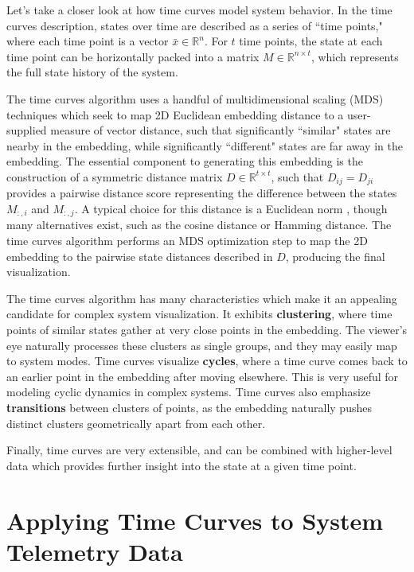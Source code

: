 Let's take a closer look at how time curves model system behavior. In the time curves description, states over time are described as a series of ``time points," where each time point is a vector $\bar{x} \in \mathbb{R}^{n}$. For $t$ time points, the state at each time point can be horizontally packed into a matrix $M \in \mathbb{R}^{n \times t}$, which represents the full state history of the system.

The time curves algorithm uses a handful of multidimensional scaling (MDS) techniques which seek to map 2D Euclidean embedding distance to a user-supplied measure of vector distance, such that significantly ``similar" states are nearby in the embedding, while significantly ``different" states are far away in the embedding. The essential component to generating this embedding is the construction of a symmetric distance matrix $D \in \mathbb{R}^{t \times t}$, such that $D_{ij} = D_{ji}$ provides a pairwise distance score representing the difference between the states $M_{:,i}$ and $M_{:,j}$. A typical choice for this distance is a Euclidean norm \cite{bach2016time}, though many alternatives exist, such as the cosine distance or Hamming distance. The time curves algorithm performs an MDS optimization step to map the 2D embedding to the pairwise state distances described in $D$, producing the final visualization.

The time curves algorithm has many characteristics which make it an appealing candidate for complex system visualization. It exhibits \textbf{clustering}, where time points of similar states gather at very close points in the embedding. The viewer's eye naturally processes these clusters as single groups, and they may easily map to system modes. Time curves visualize \textbf{cycles}, where a time curve comes back to an earlier point in the embedding after moving elsewhere. This is very useful for modeling cyclic dynamics in complex systems. Time curves also emphasize \textbf{transitions} between clusters of points, as the embedding naturally pushes distinct clusters geometrically apart from each other.

Finally, time curves are very extensible, and can be combined with higher-level data which provides further insight into the state at a given time point.

\section{Applying Time Curves to System Telemetry Data}

